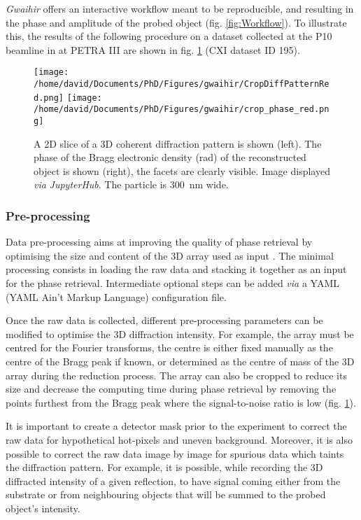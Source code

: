 \textit{Gwaihir} offers an interactive workflow meant to be reproducible, and resulting in the phase and amplitude of the probed object (fig. \ref{fig:Workflow}).
To illustrate this, the results of the following procedure on a dataset collected at the P10 beamline in at PETRA III are shown in fig. \ref{fig:GUI_file} (CXI dataset ID 195).

\begin{figure}[!htb]
    \centering
    \texttt{[image: /home/david/Documents/PhD/Figures/gwaihir/CropDiffPatternRed.png]}
    \texttt{[image: /home/david/Documents/PhD/Figures/gwaihir/crop\_phase\_red.png]}
    \caption{
    A 2D slice of a 3D coherent diffraction pattern is shown (left).
    The phase of the Bragg electronic density (\unit{\radian}) of the reconstructed object is shown (right), the facets are clearly visible.
    Image displayed \textit{via} \textit{JupyterHub}.
    The particle is \qty{300}{\nm} wide.
    }
    \label{fig:GUI_file}
\end{figure}

\subsubsection{Pre-processing} \label{sec:preprocess}

Data pre-processing aims at improving the quality of phase retrieval by optimising the size and content of the 3D array used as input \parencite{Ozturk2017}.
The minimal processing consists in loading the raw data and stacking it together as an input for the phase retrieval.
Intermediate optional steps can be added \textit{via} a YAML (YAML Ain't Markup Language) configuration file.

Once the raw data is collected, different pre-processing parameters can be modified to optimise the 3D diffraction intensity.
For example, the array must be centred for the Fourier transforms, the centre is either fixed manually as the centre of the Bragg peak if known, or determined as the centre of mass of the 3D array during the reduction process.
The array can also be cropped to reduce its size and decrease the computing time during phase retrieval by removing the points furthest from the Bragg peak where the signal-to-noise ratio is low (fig. \ref{fig:GUI_file}).

It is important to create a detector mask prior to the experiment to correct the raw data for hypothetical hot-pixels and uneven background.
Moreover, it is also possible to correct the raw data image by image for spurious data which taints the diffraction pattern.
For example, it is possible, while recording the 3D diffracted intensity of a given reflection, to have signal coming either from the substrate or from neighbouring objects that will be summed to the probed object's intensity.

